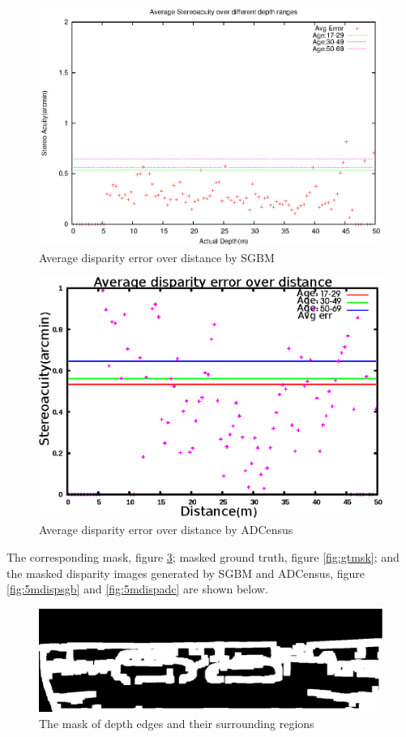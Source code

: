 \begin{figure}[H]
\centering
\includegraphics[scale=0.8]{sgbmimg5pix3msk}
\caption{Average disparity error over distance by SGBM}
\label{fig:imgmsk5}
\end{figure} 

\begin{figure}[H]
\centering
\includegraphics[scale=0.8]{adcimg5pix3msk}
\caption{Average disparity error over distance by ADCensus}
\label{fig:imgfull5}
\end{figure}

\noindent
The corresponding mask, figure \ref{fig:msk}; masked ground truth, figure \ref{fig:gtmsk}; and
the masked disparity images generated by SGBM and ADCensus, figure \ref{fig:5mdispsgb} and \ref{fig:5mdispadc} 
are shown below.

\begin{figure}[H]
\centering
\includegraphics[scale=0.35]{5msk}
\caption{The mask of depth edges and their surrounding regions}
\label{fig:msk}
\end{figure} 

